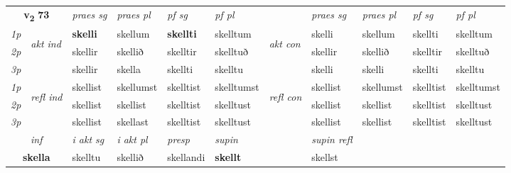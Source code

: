 \noindent
\begin{tabular}{lllllllllll} \toprule
\multicolumn{2}{c}{\textbf{v{\textsubscript{2}}} \Large{\textbf{73}}}  &  \textit{praes sg}  & \textit{praes pl}  &\textit{ pf sg} & \textit{pf pl} &  &  \textit{praes sg}  & \textit{praes pl}  & \textit{pf sg} & \textit{pf pl } \\*
	\cmidrule{3-6} \cmidrule{8-11}
 {\textit{1p}} & \multirow{3}{*}{\begin{turn}{90}\textit{akt ind}\end{turn}} & \textbf{skelli} & skellum & \textbf{skellti} & skelltum & \multirow{3}{*}{\begin{turn}{90}\textit{akt con}\end{turn}} &skelli & skellum & skellti & skelltum\\*
 {\textit{2p}} &  &  skellir  & skellið & skelltir & skelltuð & & skellir & skellið & skelltir & skelltuð \\*
{\textit{3p}} &  & skellir & skella & skellti & skelltu & & skelli & skelli& skellti & skelltu \\*
\cmidrule{3-6} \cmidrule{8-11}
 {\textit{1p}} & \multirow{3}{*}{\begin{turn}{90}\textit{refl ind}\end{turn}}  & skellist & skellumst & skelltist & skelltumst & \multirow{3}{*}{\begin{turn}{90}\textit{refl con}\end{turn}}  &skellist & skellumst & skelltist & skelltumst \\*
 {\textit{2p}} &  & skellist & skellist & skelltist & skelltust & &skellist & skellist & skelltist & skelltust \\*
 {\textit{3p}}  & & skellist & skellast & skelltist & skelltust & & skellist & skellist& skelltist & skelltust \\*
\cmidrule{3-6} \cmidrule{8-11}

   \multicolumn{2}{c}{\textit{inf}}  & \textit{i akt sg} & \textit{i akt pl}   & \textit{presp} & \textit{supin} && \textit{supin refl}  \\*
  \multicolumn{2}{c}{\textbf{skella}} & skelltu  & skellið   & skellandi &  \textbf{skellt} && skellst  \\*
\end{tabular}

